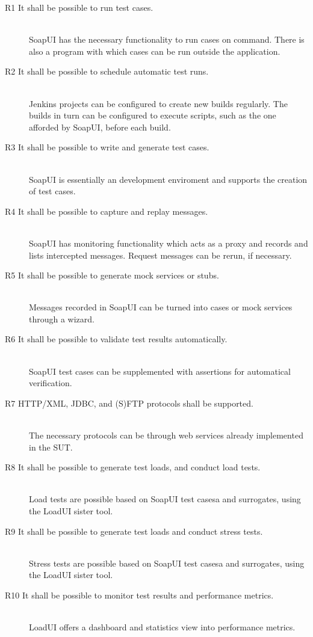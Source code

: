 \documentclass[12pt,a4paper,oneside,pdftex]{report}
\begin{document}
{\begin{description}
  \item[R1 It shall be possible to run test cases.] \hfill \\
 SoapUI has the necessary functionality to run cases on command. There is also a program with which cases can be run outside the application.
  \item[R2 It shall be possible to schedule automatic test runs.] \hfill \\
  Jenkins projects can be configured to create new builds regularly. The builds in turn can be configured to execute scripts, such as the one afforded by SoapUI, before each build.
  \item[R3 It shall be possible to write and generate test cases.] \hfill \\
  SoapUI is essentially an development enviroment and supports the creation of test cases.
  \item[R4 It shall be possible to capture and replay messages.] \hfill \\
  SoapUI has monitoring functionality which acts as a proxy and records and lists intercepted messages. Request messages can be rerun, if necessary.
  \item[R5 It shall be possible to generate mock services or stubs.] \hfill \\
  Messages recorded in SoapUI can be turned into cases or mock services through a wizard.
  \item[R6 It shall be possible to validate test results automatically.] \hfill \\
  SoapUI test cases can be supplemented with assertions for automatical verification.
  \item[R7 HTTP/XML, JDBC, and (S)FTP protocols shall be supported.]  \hfill \\
  The necessary protocols can be through web services already implemented in the SUT.
  \item[R8 It shall be possible to generate test loads, and conduct load tests.] \hfill \\
   Load tests are possible based on SoapUI test casesa and surrogates, using the LoadUI sister tool.
  \item[R9 It shall be possible to generate test loads and conduct stress tests.] \hfill \\
   Stress tests are possible based on SoapUI test casesa and surrogates, using the LoadUI sister tool.
  \item[R10 It shall be possible to monitor test results and performance metrics.] \hfill \\
 LoadUI offers a dashboard and statistics view into performance metrics.
\end{description}

}
\end{document}
